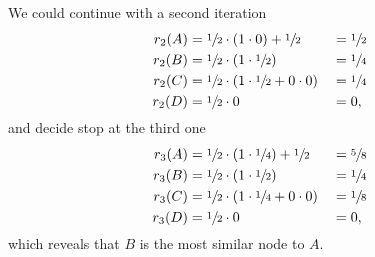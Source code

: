 We could continue with a second iteration
%
\begin{alignat*}{3}
  r_2(A) &= \sfrac{1}{2} \cdot (1\cdot0) + \sfrac{1}{2}     &&= \sfrac{1}{2} \\
  r_2(B) &= \sfrac{1}{2} \cdot (1\cdot\sfrac{1}{2})         &&= \sfrac{1}{4} \\
  r_2(C) &= \sfrac{1}{2} \cdot (1\cdot\sfrac{1}{2}+0\cdot0) &&= \sfrac{1}{4} \\
  r_2(D) &= \sfrac{1}{2} \cdot 0                            && = 0, 
\end{alignat*}
%
and decide stop at the third one
%
\begin{alignat*}{3}
  r_3(A) &= \sfrac{1}{2} \cdot (1\cdot\sfrac{1}{4}) + \sfrac{1}{2} &&= \sfrac{5}{8} \\
  r_3(B) &= \sfrac{1}{2} \cdot (1\cdot\sfrac{1}{2})                &&= \sfrac{1}{4} \\
  r_3(C) &= \sfrac{1}{2} \cdot (1\cdot\sfrac{1}{4}+0\cdot0)        &&= \sfrac{1}{8} \\
  r_3(D) &= \sfrac{1}{2} \cdot 0                                   &&= 0,
\end{alignat*}
%
which reveals that $B$ is the most similar node to $A$.